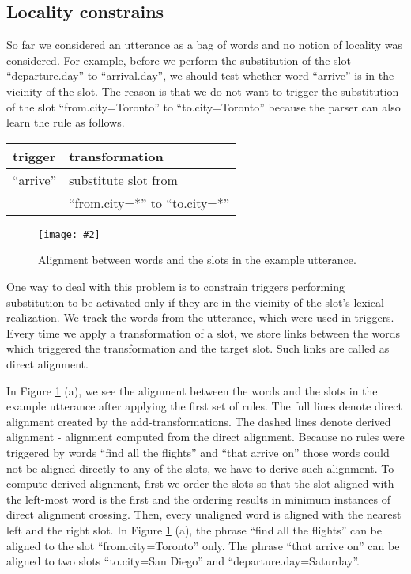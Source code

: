 \documentclass{article}
\newcommand{\fgrparam}[4]{
  \begin{figure}[htbp]
    \begin{center}
      \leavevmode
      \texttt{[image: \#2]}
    \end{center}
    \vspace{-0.5cm}
    \caption{#4}
    \label{#3}
  \end{figure}
}
\begin{document}
\subsection{Locality constrains} \label{sec:locality:constrain}

So far we considered an utterance as a bag of words and no notion of locality was considered. For example, before we perform the substitution of the slot ``departure.day'' to ``arrival.day'', we should test whether word ``arrive'' is in the vicinity of the slot. The reason is that we do not want to trigger the substitution of the slot ``from.city=Toronto'' to ``to.city=Toronto'' because the parser can also learn the rule as follows. 

\vspace{.15cm}
\begin{tabular}{ll}
  trigger & transformation \\
  \hline 
  ``arrive''            & substitute slot from\\
                        & ``from.city=*'' to ``to.city=*'' \\
\end{tabular} 
\vspace{.15cm}
\fgrparam{width=8cm}{./fig/words-slots-alignment.pdf}{fig:alignment}{Alignment between words and the slots in the example utterance.}


One way to deal with this problem is to constrain triggers performing substitution to be activated only if they are in the vicinity of the slot's lexical realization. We track the words from the utterance, which were used in triggers. Every time we apply a transformation of a slot, we store links between the words which triggered the transformation and the target slot. Such links are called as direct alignment. 


In Figure \ref{fig:alignment} (a), we see the alignment between the words and the slots in the example utterance after applying the first set of rules. The full lines denote direct alignment created by the add-transformations. The dashed lines denote derived alignment - alignment computed from the direct alignment. Because no rules were triggered by words ``find all the flights'' and ``that arrive on'' those words could not be aligned directly to any of the slots, we have to derive such alignment. To compute derived alignment, first we order the slots so that the slot aligned with the left-most word is the first and the ordering results in minimum instances of direct alignment crossing. Then, every unaligned word is aligned with the nearest left and the right slot. In Figure \ref{fig:alignment} (a), the phrase ``find all the flights'' can be aligned to the slot ``from.city=Toronto'' only. The phrase ``that arrive on'' can be aligned to two slots ``to.city=San Diego'' and ``departure.day=Saturday''.
\end{document}
